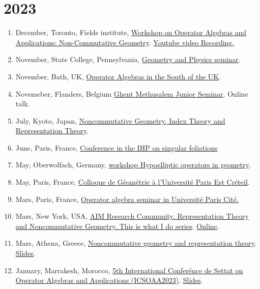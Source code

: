 \documentclass[a4paper, 13pt]{article}
\begin{document}
\section*{2023}
\begin{enumerate}
\item December, Toronto, Fields institute, \href{http://www.fields.utoronto.ca/activities/23-24/operator-noncommutative}{Workshop on Operator Algebras and Applications: Non-Commutative Geometry}. \href{https://www.youtube.com/watch?v=sufxJSKJ_qk&list=PLArBKNfJxuum6xCTUag8Yso0wnN8ayESE&index=21}{Youtube video Recording.}
\item November, State College, Pennsylvania, \href{https://math-cal.cloud.science.psu.edu/events/seminar/408}{Geometry and Physics seminar}.
\item November, Bath, UK, \href{https://sites.google.com/view/operatoralgebrasinthesouth/home}{Operator Algebras in the South of the UK}.
\item Novemeber, Flanders, Belgium \href{https://analysis-pde.org/ghent-methusalem-junior-seminar/}{Ghent Methusalem Junior Seminar}. Online talk.
\item July, Kyoto, Japan, \href{https://indico.math.cnrs.fr/event/8330/}{Noncommutative Geometry, Index Theory and Representation Theory}.
\item June, Paris, France, \href{https://indico.math.cnrs.fr/event/7893/timetable/}{Conference in the IHP on singular foliations}
\item May, Oberwolfach, Germany, \href{https://www.mfo.de/occasion/2321/www_view}{workshop Hypoelliptic operators in geometry}.
\item May, Paris, France, \href{https://fanoni.perso.math.cnrs.fr/colloque.html}{Colloque de Géométrie à l'Université Paris Est Créteil}.
\item Mars, Paris, France, \href{https://www.imj-prg.fr/ao/seminaires/}{Operator algebra seminar in Université Paris Cité.} 
\item Mars, New York, USA, \href{https://prclare.people.wm.edu/AIM_RTNCG/tiwid.php}{AIM Research Community. Representation Theory and Noncommutative Geometry. This is what I do series}. \href{}{Online}.
\item Mars, Athena, Greece, \href{https://conferences.uoa.gr/event/56/}{Noncommutative geometry and representation theory}. \href{}{Slides}.
\item January, Marrakesh, Morocco, \href{https://sites.google.com/view/icsoaa-2023/}{5th International Conferénce de Settat on Operator Algebras and Applications (ICSOAA2023)}. \href{}{Slides}.
\end{enumerate}
\end{document}
